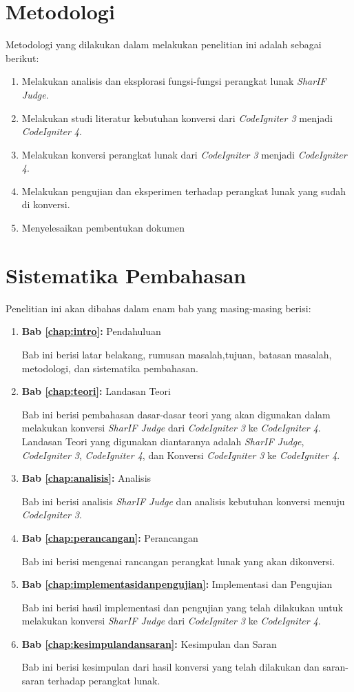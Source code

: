 \section{Metodologi}
\label{sec:metlit}
Metodologi yang dilakukan dalam melakukan penelitian ini adalah sebagai berikut:
\begin{enumerate}
	\item Melakukan analisis dan eksplorasi fungsi-fungsi perangkat lunak \textit{SharIF Judge}.
	\item Melakukan studi literatur kebutuhan konversi dari \textit{CodeIgniter 3} menjadi \textit{CodeIgniter 4}.
	\item Melakukan konversi perangkat lunak dari \textit{CodeIgniter 3} menjadi \textit{CodeIgniter 4}.
	\item Melakukan pengujian dan eksperimen terhadap perangkat lunak yang sudah di konversi.
	\item Menyelesaikan pembentukan dokumen
\end{enumerate}

\section{Sistematika Pembahasan}
\label{sec:sispem}
Penelitian ini akan dibahas dalam enam bab yang masing-masing berisi:
\begin{enumerate}
	\item \textbf{Bab \ref{chap:intro}:} Pendahuluan
	
	Bab ini berisi latar belakang, rumusan masalah,tujuan, batasan masalah, metodologi, dan sistematika pembahasan.
	\item \textbf{Bab \ref{chap:teori}:} Landasan Teori
	
	Bab ini berisi pembahasan dasar-dasar teori yang akan digunakan dalam melakukan konversi \textit{SharIF Judge} dari \textit{CodeIgniter 3} ke \textit{CodeIgniter 4}. Landasan Teori yang digunakan diantaranya adalah \textit{SharIF Judge}, \textit{CodeIgniter 3}, \textit{CodeIgniter 4}, dan Konversi \textit{CodeIgniter 3} ke \textit{CodeIgniter 4}.
	\item \textbf{Bab \ref{chap:analisis}:} Analisis
	
	Bab ini berisi analisis \textit{SharIF Judge} dan analisis kebutuhan konversi menuju \textit{CodeIgniter 3}.
	\item \textbf{Bab \ref{chap:perancangan}:} Perancangan
	
	Bab ini berisi mengenai rancangan perangkat lunak yang akan dikonversi.
	\item \textbf{Bab \ref{chap:implementasidanpengujian}:} Implementasi dan Pengujian
	
	Bab ini berisi hasil implementasi dan pengujian yang telah dilakukan untuk melakukan konversi \textit{SharIF Judge} dari \textit{CodeIgniter 3} ke \textit{CodeIgniter 4}.
	\item \textbf{Bab \ref{chap:kesimpulandansaran}:} Kesimpulan dan Saran
	
	Bab ini berisi kesimpulan dari hasil konversi yang telah dilakukan dan saran-saran terhadap perangkat lunak.
\end{enumerate}

